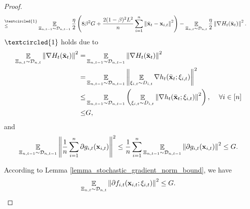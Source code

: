 \documentclass{article}
\begin{document}
\begin{proof}
\begin{align}
\refabovecir{\le}{\textcircled{1}} & \EE_{ \Xi_{n,t-1} \sim \Dcal_{n,t-1} } \frac{\eta}{2}\lrincir{ 8\beta^2 G + \frac{2(1-\beta)^2L^2}{n}\sum_{i=1}^n \lrnorm{ \bar{\x}_t - \x_{i,t} }^2 }  - \EE_{ \Xi_{n,t} \sim \Dcal_{n,t} } \frac{\eta}{2} \lrnorm{\nabla H_t(\bar{\x}_t)}^2.
\end{align} $\textcircled{1}$ holds due to 
\begin{align}
\nonumber
\mathop{\mathbb{E}}_{ \Xi_{n,t} \sim \mathcal{D}_{n,t} } \left\lVert\nabla H_t(\bar{{\bf x}}_t)\right\rVert^2 =  & \mathop{\mathbb{E}}_{ \Xi_{n,t-1} \sim \mathcal{D}_{n,t-1} } \left\lVert\nabla H_t(\bar{{\bf x}}_t)\right\rVert^2 \\ \nonumber
= & \mathop{\mathbb{E}}_{ \Xi_{n,t-1} \sim \mathcal{D}_{n,t-1} } \left\lVert\mathop{\mathbb{E}}_{\xi_{i,t}\sim D_{i,t}} \nabla h_t(\bar{{\bf x}}_t;\xi_{i,t})\right\rVert^2 \\ \nonumber
\le & \mathop{\mathbb{E}}_{ \Xi_{n,t-1} \sim \mathcal{D}_{n,t-1} } \left( \mathop{\mathbb{E}}_{\xi_{i,t}\sim D_{i,t}}\left\lVert\nabla h_t(\bar{{\bf x}}_t;\xi_{i,t})\right\rVert^2 \right) \text{,~~~~} \forall i\in[n]\\ \nonumber
\le & G,
\end{align} and 
\begin{align}
\nonumber
\mathop{\mathbb{E}}_{ \Xi_{n,t-1} \sim \mathcal{D}_{n,t-1} }\left\lVert\frac{1}{n}\sum_{i=1}^n \partial g_{i,t}({\bf x}_{i,t})\right\rVert^2 \le \frac{1}{n}\sum_{i=1}^n  \mathop{\mathbb{E}}_{ \Xi_{n,t-1} \sim \mathcal{D}_{n,t-1} }\left\lVert\partial g_{i,t}({\bf x}_{i,t})\right\rVert^2 \le G.
\end{align}




According to Lemma \ref{lemma_stochastic_gradient_norm_bound}, we have
\begin{align}
\label{equa_lemma_gradient_norm_temp2}
\mathop{\mathbb{E}}_{ \Xi_{n,t} \sim \mathcal{D}_{n,t} }\left\lVert \partial f_{i,t}({\bf x}_{i,t};\xi_{i,t})\right\rVert^2 \le G.
\end{align}


\end{proof}
\end{document}
